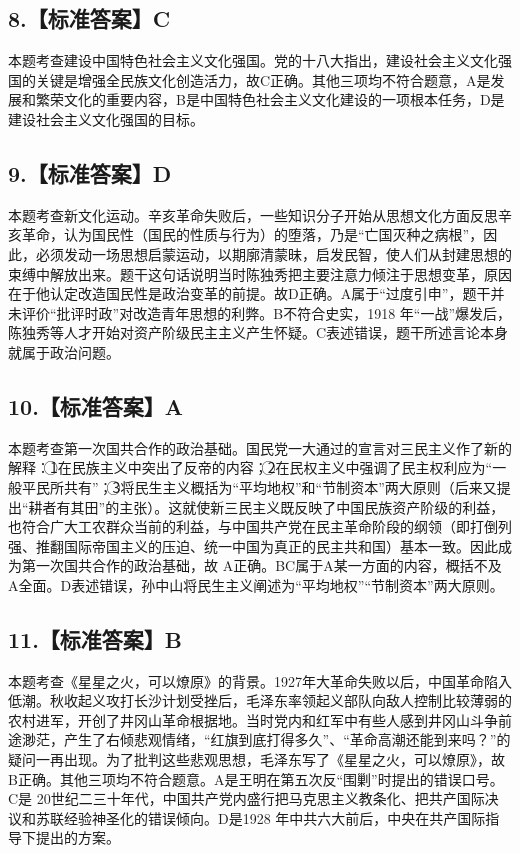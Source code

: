 \documentclass[UTF8,11pt]{ctexart}
\begin{document}
\subsection*{8.【标准答案】C}

本题考查建设中国特色社会主义文化强国。党的十八大指出，建设社会主义文化强国的关键是增强全民族文化创造活力，故C正确。其他三项均不符合题意，A是发展和繁荣文化的重要内容，B是中国特色社会主义文化建设的一项根本任务，D是建设社会主义文化强国的目标。


\subsection*{9.【标准答案】D}

本题考查新文化运动。辛亥革命失败后，一些知识分子开始从思想文化方面反思辛亥革命，认为国民性（国民的性质与行为）的堕落，乃是“亡国灭种之病根”，因此，必须发动一场思想启蒙运动，以期廓清蒙昧，启发民智，使人们从封建思想的束缚中解放出来。题干这句话说明当时陈独秀把主要注意力倾注于思想变革，原因在于他认定改造国民性是政治变革的前提。故D正确。A属于“过度引申”，题干并未评价“批评时政”对改造青年思想的利弊。B不符合史实，1918 年“一战”爆发后，陈独秀等人才开始对资产阶级民主主义产生怀疑。C表述错误，题干所述言论本身就属于政治问题。


\subsection*{10.【标准答案】A}

本题考查第一次国共合作的政治基础。国民党一大通过的宣言对三民主义作了新的解释：\textcircled{1}在民族主义中突出了反帝的内容；\textcircled{2}在民权主义中强调了民主权利应为“一般平民所共有”；\textcircled{3}将民生主义概括为“平均地权”和“节制资本”两大原则（后来又提出“耕者有其田”的主张）。这就使新三民主义既反映了中国民族资产阶级的利益，也符合广大工农群众当前的利益，与中国共产党在民主革命阶段的纲领（即打倒列强、推翻国际帝国主义的压迫、统一中国为真正的民主共和国）基本一致。因此成为第一次国共合作的政治基础，故 A正确。BC属于A某一方面的内容，概括不及 A全面。D表述错误，孙中山将民生主义阐述为“平均地权”“节制资本”两大原则。


\subsection*{11.【标准答案】B}

本题考查《星星之火，可以燎原》的背景。1927年大革命失败以后，中国革命陷入低潮。秋收起义攻打长沙计划受挫后，毛泽东率领起义部队向敌人控制比较薄弱的农村进军，开创了井冈山革命根据地。当时党内和红军中有些人感到井冈山斗争前途渺茫，产生了右倾悲观情绪，“红旗到底打得多久”、“革命高潮还能到来吗？”的疑问一再出现。为了批判这些悲观思想，毛泽东写了《星星之火，可以燎原》，故B正确。其他三项均不符合题意。A是王明在第五次反“围剿”时提出的错误口号。C是 20世纪二三十年代，中国共产党内盛行把马克思主义教条化、把共产国际决议和苏联经验神圣化的错误倾向。D是1928 年中共六大前后，中央在共产国际指导下提出的方案。
\end{document}
